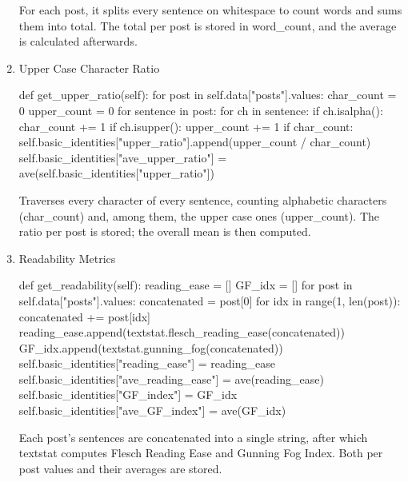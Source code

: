 \documentclass[12pt]{article}
\begin{document}
\begin{enumerate}
		For each post, it splits every sentence on whitespace to count words and sums them into total. The total per post is stored in word\_count, and the average is calculated afterwards.
		\item Upper Case Character Ratio
		\begin{python}
def get_upper_ratio(self):
    for post in self.data["posts"].values:
        char_count = 0
        upper_count = 0
        for sentence in post:
            for ch in sentence:
                if ch.isalpha():
                    char_count += 1
                    if ch.isupper():
                        upper_count += 1
        if char_count:
            self.basic_identities["upper_ratio"].append(upper_count / char_count)
    self.basic_identities["ave_upper_ratio"] = ave(self.basic_identities["upper_ratio"])
		\end{python}
		
		Traverses every character of every sentence, counting alphabetic characters (char\_count) and, among them, the upper case ones (upper\_count). The ratio per post is stored; the overall mean is then computed.
		\item Readability Metrics
		\begin{python}
def get_readability(self):
    reading_ease = []
    GF_idx = []
    for post in self.data["posts"].values:
        concatenated = post[0]
        for idx in range(1, len(post)):
            concatenated += post[idx]
        reading_ease.append(textstat.flesch_reading_ease(concatenated))
        GF_idx.append(textstat.gunning_fog(concatenated))
    self.basic_identities["reading_ease"] = reading_ease
    self.basic_identities["ave_reading_ease"] = ave(reading_ease)
    self.basic_identities["GF_index"] = GF_idx
    self.basic_identities["ave_GF_index"] = ave(GF_idx)
		\end{python}
		
		Each post’s sentences are concatenated into a single string, after which textstat computes Flesch Reading Ease and Gunning Fog Index. Both per post values and their averages are stored.
	\end{enumerate}
	
\end{document}
